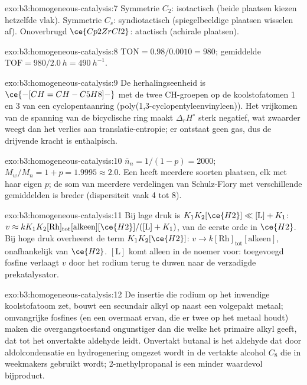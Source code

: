 \begin{solution}{exo:b3:homogeneous-catalysis:7}
Symmetrie $C_2$: isotactisch (beide plaatsen kiezen hetzelfde vlak). Symmetrie $C_s$:
syndiotactisch (spiegelbeeldige plaatsen wisselen af). Onoverbrugd $\ce{Cp2ZrCl2}$: atactisch
(achirale plaatsen).
\end{solution}

\begin{solution}{exo:b3:homogeneous-catalysis:8}
$\mathrm{TON} = 0.98/0.0010 = 980$; gemiddelde $\mathrm{TOF} = 980/\qty{2.0}{h} = \qty{490}{h^{-1}}$.
\end{solution}

\begin{solution}{exo:b3:homogeneous-catalysis:9}
De herhalingseenheid is $\ce{-[CH=CH-C5H8]-}$ met de twee CH-groepen op de koolstofatomen 1 en 3 van een
cyclopentaanring (poly(1,3-cyclopentyleenvinyleen)). Het vrijkomen van de
spanning van de bicyclische ring maakt $\Delta_rH^\circ$ sterk negatief, wat zwaarder weegt
dan het verlies aan translatie-entropie; er ontstaat geen gas, dus de
drijvende kracht is enthalpisch.
\end{solution}

\begin{solution}{exo:b3:homogeneous-catalysis:10}
$\bar n_n = 1/(1 - p) = 2000$; $M_w/M_n = 1 + p = 1.9995 \approx 2.0$. Een  heeft
meerdere soorten plaatsen, elk met haar eigen $p$; de som van meerdere
verdelingen van Schulz-Flory met verschillende gemiddelden is breder
(dispersiteit vaak 4 tot 8).
\end{solution}

\begin{solution}{exo:b3:homogeneous-catalysis:11}
Bij lage druk is $K_1K_2[\ce{H2}] \ll [\mathrm L] + K_1$: $v \approx kK_1K_2[\mathrm{Rh}]_{\mathrm{tot}}[\text{alkeen}][\ce{H2}]/([\mathrm L] + K_1)$,
van de eerste orde in $\ce{H2}$. Bij hoge druk overheerst de term $K_1K_2[\ce{H2}]$: $v \to k[\mathrm{Rh}]_{\mathrm{tot}}[\text{alkeen}]$,
onafhankelijk van $\ce{H2}$. $[\mathrm L]$ komt alleen in de noemer voor: toegevoegd fosfine verlaagt $v$
door het rodium terug te duwen naar de verzadigde prekatalysator.
\end{solution}

\begin{solution}{exo:b3:homogeneous-catalysis:12}
De insertie die rodium op het inwendige koolstofatoom zet, bouwt een
secundair alkyl op naast een volgepakt metaal; omvangrijke fosfines (en
een overmaat ervan, die er twee op het metaal houdt) maken die
overgangstoestand ongunstiger dan die welke het primaire alkyl geeft, dat
tot het onvertakte aldehyde leidt. Onvertakt butanal is het aldehyde dat
door aldolcondensatie en hydrogenering omgezet wordt in de vertakte alcohol $C_8$ die in
weekmakers gebruikt wordt; 2-methylpropanal is een minder waardevol
bijproduct.
\end{solution}

